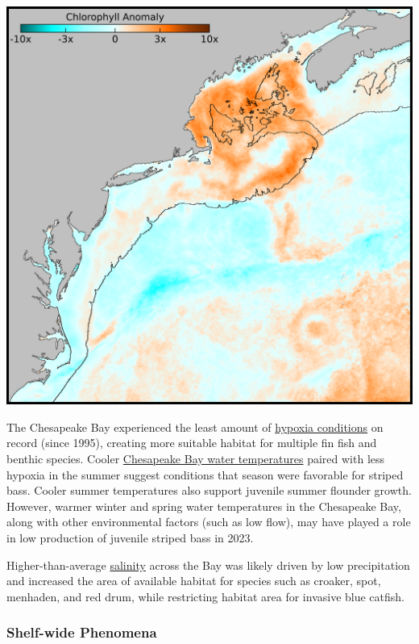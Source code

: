 \documentclass[
  10pt,
]{article}
\let\origfigure\figure
\let\endorigfigure\endfigure
\renewenvironment{figure}[1][2] {
    \expandafter\origfigure\expandafter[H]
} {
    \endorigfigure
}
\begin{document}
\begin{figure}

{\centering \includegraphics[width=0.6\linewidth]{SOE-NEFMC_files/figure-latex/gom-bloom-2023-1} 

}

\caption{The chlorophyll anomaly for June 2023. Chlorophyll concentrations in the Gulf of Maine were 5-10 times greater than the long-term June average.}\label{fig:gom-bloom-2023}
\end{figure}

The Chesapeake Bay experienced the least amount of \href{https://noaa-edab.github.io/catalog/chesapeake-bay-2023-synthesis.html}{hypoxia conditions} on record (since 1995), creating more suitable habitat for multiple fin fish and benthic species. Cooler \href{https://noaa-edab.github.io/catalog/chesapeake-bay-seasonal-sea-surface-temperature-anomaly.html}{Chesapeake Bay water temperatures} paired with less hypoxia in the summer suggest conditions that season were favorable for striped bass. Cooler summer temperatures also support juvenile summer flounder growth. However, warmer winter and spring water temperatures in the Chesapeake Bay, along with other environmental factors (such as low flow), may have played a role in low production of juvenile striped bass in 2023.

Higher-than-average \href{https://noaa-edab.github.io/catalog/chesapeake-bay-salinity.html}{salinity} across the Bay was likely driven by low precipitation and increased the area of available habitat for species such as croaker, spot, menhaden, and red drum, while restricting habitat area for invasive blue catfish.

\hypertarget{shelf-wide-phenomena}{%
\subsubsection{Shelf-wide Phenomena}\label{shelf-wide-phenomena}}
\end{document}
